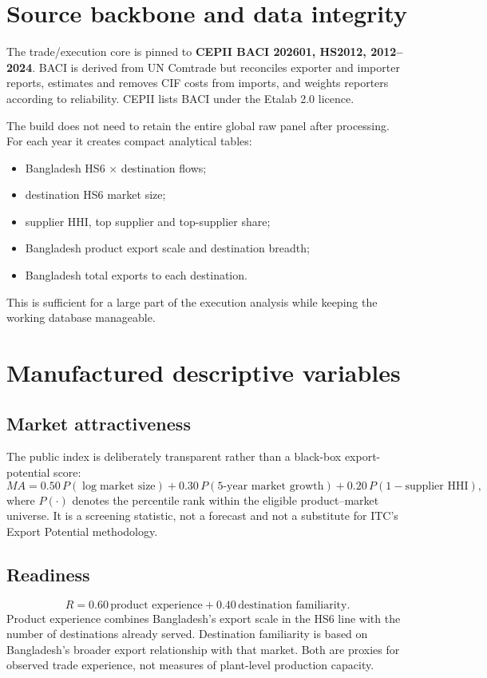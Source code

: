 \documentclass[11pt]{article}
\begin{document}
\section{Source backbone and data integrity}
The trade/execution core is pinned to \textbf{CEPII BACI 202601, HS2012, 2012--2024}. BACI is derived from UN Comtrade but reconciles exporter and importer reports, estimates and removes CIF costs from imports, and weights reporters according to reliability. CEPII lists BACI under the Etalab 2.0 licence.

The build does not need to retain the entire global raw panel after processing. For each year it creates compact analytical tables:
\begin{itemize}
\item Bangladesh HS6 $\times$ destination flows;
\item destination HS6 market size;
\item supplier HHI, top supplier and top-supplier share;
\item Bangladesh product export scale and destination breadth;
\item Bangladesh total exports to each destination.
\end{itemize}
This is sufficient for a large part of the execution analysis while keeping the working database manageable.

\section{Manufactured descriptive variables}
\subsection{Market attractiveness}
The public index is deliberately transparent rather than a black-box export-potential score:
\[
MA = 0.50\,P(\log \text{market size}) + 0.30\,P(\text{5-year market growth}) + 0.20\,P(1-\text{supplier HHI}),
\]
where $P(\cdot)$ denotes the percentile rank within the eligible product--market universe. It is a screening statistic, not a forecast and not a substitute for ITC's Export Potential methodology.

\subsection{Readiness}
\[
R = 0.60\,\text{product experience}+0.40\,\text{destination familiarity}.
\]
Product experience combines Bangladesh's export scale in the HS6 line with the number of destinations already served. Destination familiarity is based on Bangladesh's broader export relationship with that market. Both are proxies for observed trade experience, not measures of plant-level production capacity.
\end{document}
